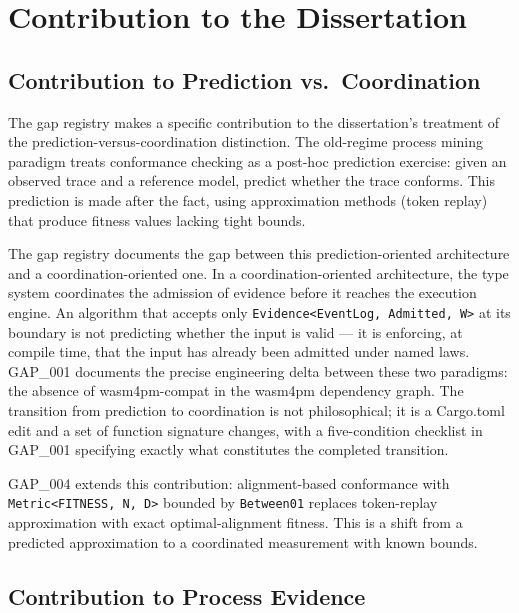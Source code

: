 
\section{Contribution to the Dissertation}
\label{sec:gaps-contribution}

\subsection{Contribution to Prediction vs.~Coordination}
\label{sec:gaps-contribution-prediction}

The gap registry makes a specific contribution to the dissertation's treatment of the
prediction-versus-coordination distinction. The old-regime process mining paradigm treats
conformance checking as a post-hoc prediction exercise: given an observed trace and a
reference model, predict whether the trace conforms. This prediction is made after the
fact, using approximation methods (token replay) that produce fitness values lacking
tight bounds.

The gap registry documents the gap between this prediction-oriented architecture and a
coordination-oriented one. In a coordination-oriented architecture, the type system
coordinates the admission of evidence before it reaches the execution engine. An
algorithm that accepts only \texttt{Evidence<EventLog, Admitted, W>} at its boundary
is not predicting whether the input is valid — it is enforcing, at compile time, that
the input has already been admitted under named laws. GAP\_001 documents the precise
engineering delta between these two paradigms: the absence of wasm4pm-compat in the
wasm4pm dependency graph. The transition from prediction to coordination is not
philosophical; it is a Cargo.toml edit and a set of function signature changes, with
a five-condition checklist in GAP\_001 specifying exactly what constitutes the
completed transition.

GAP\_004 extends this contribution: alignment-based conformance with
\texttt{Metric<FITNESS, N, D>} bounded by \texttt{Between01} replaces token-replay
approximation with exact optimal-alignment fitness. This is a shift from a predicted
approximation to a coordinated measurement with known bounds.

\subsection{Contribution to Process Evidence}
\label{sec:gaps-contribution-evidence}

